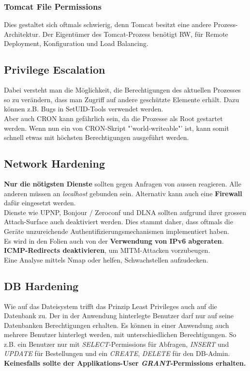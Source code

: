 \subsubsection{Tomcat File Permissions}
Dies gestaltet sich oftmals schwierig, denn Tomcat besitzt eine andere Prozess-Architektur. Der Eigentümer des Tomcat-Prozess benötigt RW, für Remote Deployment, Konfiguration und Load Balancing.

\subsection{Privilege Escalation}
Dabei versteht man die Möglichkeit, die Berechtigungen des aktuellen Prozesses so zu verändern, dass man Zugriff auf andere geschützte Elemente erhält. Dazu können z.B. Bugs in SetUID-Tools verwendet werden.\\

Aber auch CRON kann gefährlich sein, da die Prozesse als Root gestartet werden. Wenn nun ein von CRON-Skript "'world-writeable"' ist, kann somit schnell etwas mit höchsten Berechtigungen ausgeführt werden.

\subsection{Network Hardening}
\textbf{Nur die nötigsten Dienste} sollten gegen Anfragen von aussen reagieren. Alle anderen müssen an \textit{localhost} gebunden sein. Alternativ kann auch eine \textbf{Firewall} dafür eingesetzt werden.\\
Dienste wie UPNP, Bonjour / Zeroconf und DLNA sollten aufgrund ihrer grossen Attach-Surface auch deaktiviert werden. Dies stammt daher, dass oftmals die Geräte unzureichende Authentifizierungsmechanismen implementiert haben.\\

Es wird in den Folien auch von der \textbf{Verwendung von IPv6 abgeraten}.\\

\textbf{ICMP-Redirects deaktivieren}, um MITM-Attacken vorzubeugen.\\

Eine Analyse mittels Nmap oder  helfen, Schwachstellen aufzudecken.

\subsection{DB Hardening}
Wie auf das Dateisystem trifft das Prinzip Least Privileges auch auf die Datenbank zu. Der in der Anwendung hinterlegte Benutzer darf nur auf seine Datenbanken Berechtigungen erhalten. Es können in einer Anwendung auch mehrere Benutzer hinterlegt werden, mit unterschiedlichen Berechtigungen. So z.B. ein Benutzer nur mit \textit{SELECT}-Permissions für Abfragen, \textit{INSERT} und \textit{UPDATE} für Bestellungen und ein \textit{CREATE}, \textit{DELETE} für den DB-Admin.\\
\textbf{Keinesfalls sollte der Applikations-User \textit{GRANT}-Permissions erhalten.}